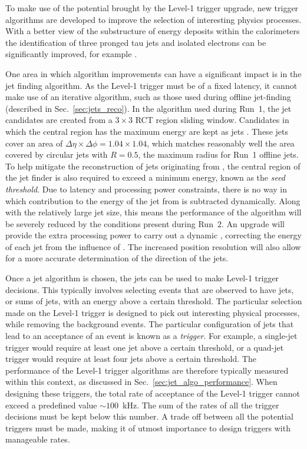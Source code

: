 To make use of the potential brought by the Level-1 trigger upgrade,
new trigger algorithms are developed to improve the selection of
interesting physics processes. With a better view of the substructure
of energy deposits within the calorimeters the identification of three
pronged tau jets and isolated electrons can be significantly improved,
for example \cite{egllr,taullr}. 

One area in which algorithm improvements can have a significant impact
is in the jet finding algorithm. As the Level-1 trigger must be of a
fixed latency, it cannot make use of an iterative algorithm, such as
those used during offline jet-finding (described in
Sec.~\ref{sec:jets_reco}). In the algorithm used during Run~1, the jet
candidates are created from a $3\times3$ \ac{RCT} region sliding
window.  Candidates in which the central region has the maximum energy
are kept as jets \cite{Chatrchyan:2008aa}. These jets cover an area of
$\Delta\eta\times\Delta\phi = 1.04 \times 1.04$, which matches
reasonably well the area covered by circular jets with $R=0.5$, the
maximum radius for Run~1 offline jets.  To help mitigate the
reconstruction of jets originating from \PU, the central region of the
jet finder is also required to exceed a minimum energy, known as the
\emph{seed threshold}. Due to latency and processing power
constraints, there is no way in which contribution to the energy of
the jet from \PU is subtracted dynamically. Along with the relatively
large jet size, this means the performance of the algorithm will be
severely reduced by the conditions present during Run~2. An upgrade
will provide the extra processing power to carry out a dynamic \PUS,
correcting the energy of each jet from the influence of \PU. The
increased position resolution will also allow for a more accurate
determination of the direction of the jets.

Once a jet algorithm is chosen, the jets can be used to make Level-1
trigger decisions. This typically involves selecting events that are
observed to have jets, or sums of jets, with an energy above a certain
threshold. The particular selection made on the Level-1 trigger is
designed to pick out interesting physical processes, while removing
the background events. The particular configuration of jets that lead
to an acceptance of an event is known as a \emph{trigger}. For
example, a single-jet trigger would require at least one jet above a
certain \pT threshold, or a quad-jet trigger would require at least
four jets above a certain threshold. The performance of the Level-1
trigger algorithms are therefore typically measured within this
context, as discussed in Sec.~\ref{sec:jet_algo_performance}.  When
designing these triggers, the total rate of acceptance of the Level-1
trigger cannot exceed a predefined value $\sim 100$~kHz. The sum of
the rates of all the trigger decisions must be kept below this number.
A trade off between all the potential triggers must be made, making it
of utmost importance to design triggers with manageable rates.

